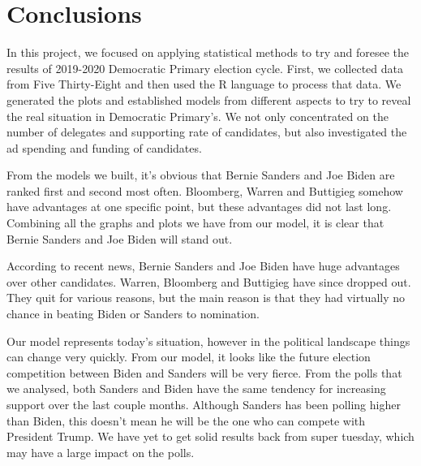 \section{Conclusions}\label{conclusions}

In this project, we focused on applying statistical methods to try and foresee the results of 2019-2020 Democratic Primary election cycle. First, we collected data from Five Thirty-Eight and then used the R language to process that data. We generated the plots and established models from different aspects to try to reveal the real situation in Democratic Primary's. We not only concentrated on the number of delegates and supporting rate of candidates, but also investigated the ad spending and funding of candidates.

From the models we built, it’s obvious that Bernie Sanders and Joe Biden are ranked first and second most often. Bloomberg, Warren and Buttigieg somehow have advantages at one specific point, but these advantages did not last long. Combining all the graphs and plots we have from our model, it is clear that Bernie Sanders and Joe Biden will stand out.

According to recent news, Bernie Sanders and Joe Biden have huge advantages over other candidates. Warren, Bloomberg and Buttigieg have since dropped out. They quit for various reasons, but the main reason is that they had virtually no chance in beating Biden or Sanders to nomination. 

Our model represents today’s situation, however in the political landscape things can change very quickly. From our model, it looks like the future election competition between Biden and Sanders will be very fierce. From the polls that we analysed, both Sanders and Biden have the same tendency for increasing support over the last couple months. Although Sanders has been polling higher than Biden, this doesn’t mean he will be the one who can compete with President Trump. We have yet to get solid results back from super tuesday, which may have a large impact on the polls.